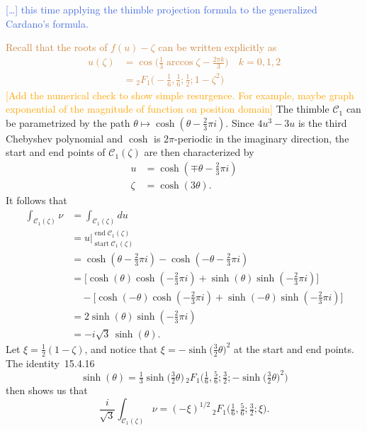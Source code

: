 \documentclass{article}
\theoremstyle{definition}
\theoremstyle{plain}
\begin{document}
\textcolor{RoyalBlue}{[\ldots] this time applying the thimble projection formula to the generalized Cardano's formula.}

\textcolor{Peru}{Recall that the roots of $f(u)-\zeta$ can be written explicitly as 
\begin{align*}
    u(\zeta)&=\cos\Big(\frac{1}{3}\arccos\zeta-\frac{2\pi k}{3}\Big) \quad k=0,1,2\\
    &={}_2F_1\Big(-\frac{1}{6},\frac{1}{6};\frac{1}{2};1-\zeta^2\Big)
\end{align*}}
\textcolor{orange}{[Add the numerical check to show simple resurgence. For example, maybe graph exponential of the magnitude of function on position domain]}
The thimble $\mathcal{C}_1$ can be parametrized by the path $\theta \mapsto \cosh(\theta - \tfrac{2}{3}\pi i)$. Since $4u^3 - 3u$ is the third Chebyshev polynomial and $\cosh$ is $2\pi$-periodic in the imaginary direction, the start and end points of $\mathcal{C}_1(\zeta)$ are then characterized by
\begin{align*}
u & = \cosh(\mp\theta - \tfrac{2}{3}\pi i) \\
\zeta & = \cosh(3\theta).
\end{align*}
It follows that
\begin{align*}
\int_{\mathcal{C}_1(\zeta)} \nu & = \int_{\mathcal{C}_1(\zeta)} du \\
& = u \Big|_{\operatorname{start} \mathcal{C}_1(\zeta)}^{\operatorname{end} \mathcal{C}_1(\zeta)}\\
 & = \cosh(\theta - \tfrac{2}{3}\pi i) - \cosh(-\theta - \tfrac{2}{3}\pi i) \\
& = \big[\cosh(\theta) \cosh(-\tfrac{2}{3}\pi i) + \sinh(\theta) \sinh(-\tfrac{2}{3}\pi i)\big] \\
& \quad - \big[\cosh(-\theta) \cosh(-\tfrac{2}{3}\pi i) + \sinh(-\theta) \sinh(-\tfrac{2}{3}\pi i)\big] \\
& = 2\sinh(\theta) \sinh(-\tfrac{2}{3}\pi i) \\
& = -i\sqrt{3}\,\sinh(\theta).
\end{align*}
Let $\xi = \tfrac{1}{2}(1 - \zeta)$, and notice that $\xi = -\sinh\big(\tfrac{3}{2} \theta\big)^2$ at the start and end points. The identity~15.4.16 \cite{dlmf}
\[ \sinh( \theta) = \tfrac{1}{3} \sinh\big( \tfrac{3}{2}\theta\big)\,{}_2F_1\big(\tfrac{1}{6}, \tfrac{5}{6}; \tfrac{3}{2}; -\sinh\big(\tfrac{3}{2}\theta\big)^2\big) \]
then shows us that
\[ \frac{i}{\sqrt{3}} \int_{\mathcal{C}_1(\zeta)} \nu = (-\xi)^{1/2}\,{}_2F_1\big(\tfrac{1}{6}, \tfrac{5}{6}; \tfrac{3}{2}; \xi\big). \]
\end{document}
